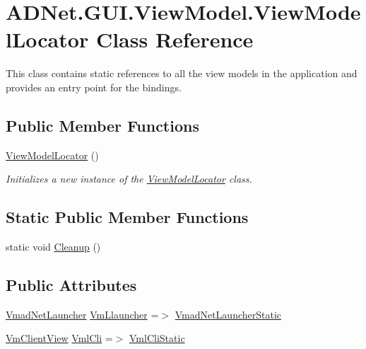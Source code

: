 \hypertarget{class_a_d_net_1_1_g_u_i_1_1_view_model_1_1_view_model_locator}{}\section{A\+D\+Net.\+G\+U\+I.\+View\+Model.\+View\+Model\+Locator Class Reference}
\label{class_a_d_net_1_1_g_u_i_1_1_view_model_1_1_view_model_locator}


This class contains static references to all the view models in the application and provides an entry point for the bindings.  


\subsection*{Public Member Functions}
\begin{DoxyCompactItemize}
\item 
\hyperlink{class_a_d_net_1_1_g_u_i_1_1_view_model_1_1_view_model_locator_afd33185cda62ddf47d114be2978693a6}{View\+Model\+Locator} ()
\begin{DoxyCompactList}\small\item\em Initializes a new instance of the \hyperlink{class_a_d_net_1_1_g_u_i_1_1_view_model_1_1_view_model_locator}{View\+Model\+Locator} class. \end{DoxyCompactList}\end{DoxyCompactItemize}
\subsection*{Static Public Member Functions}
\begin{DoxyCompactItemize}
\item 
static void \hyperlink{class_a_d_net_1_1_g_u_i_1_1_view_model_1_1_view_model_locator_a7fb96b4824a83cef2f1e6d686fb4a114}{Cleanup} ()
\end{DoxyCompactItemize}
\subsection*{Public Attributes}
\begin{DoxyCompactItemize}
\item 
\hyperlink{class_a_d_net_1_1_g_u_i_1_1_view_model_1_1_vmad_net_launcher}{Vmad\+Net\+Launcher} \hyperlink{class_a_d_net_1_1_g_u_i_1_1_view_model_1_1_view_model_locator_aaa2e7ea225ba493ef465918ac4ef2943}{Vm\+Llauncher} =$>$ \hyperlink{class_a_d_net_1_1_g_u_i_1_1_view_model_1_1_view_model_locator_a04e0f62e6c93901369e1f394255f9dd4}{Vmad\+Net\+Launcher\+Static}
\item 
\hyperlink{class_a_d_net_1_1_g_u_i_1_1_view_model_1_1_vm_client_view}{Vm\+Client\+View} \hyperlink{class_a_d_net_1_1_g_u_i_1_1_view_model_1_1_view_model_locator_a4d5aa2ef3d7414ad85726a00accef93d}{Vml\+Cli} =$>$ \hyperlink{class_a_d_net_1_1_g_u_i_1_1_view_model_1_1_view_model_locator_abfa3b191a10cd9af2b53c93abd95c5bb}{Vml\+Cli\+Static}
\end{DoxyCompactItemize}
